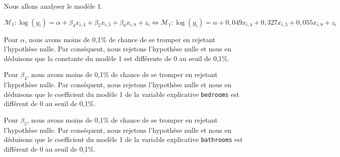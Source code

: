 \documentclass[
  11pt,
  french,
]{article}
\begin{document}
\begin{table}[!h]

\caption{\label{tab:unnamed-chunk-25}Comparaison des performances des régressions linéaires de l'analyse 2}
\centering
{}
\end{table}

Nous allons analyser le modèle 1.

\[\mathcal{M}_{1}:\log(y_{i})=\alpha+\beta_{4}x_{i,4}+\beta_{5}x_{i,5}+\beta_{8}x_{i,8}+z_{i} \iff \mathcal{M}_{1}:\log(y_{i})=\alpha+0,049x_{i,4}+0,327x_{i,5}+0,055x_{i,8}+z_{i}\]

Pour \(\alpha\), nous avons moins de 0,1\% de chance de se tromper en
rejetant l'hypothèse nulle. Par conséquent, nous rejetons l'hypothèse
nulle et nous en déduisons que la constante du modèle 1 est différente
de 0 au seuil de 0,1\%.

Pour \(\beta_{4}\), nous avons moins de 0,1\% de chance de se tromper en
rejetant l'hypothèse nulle. Par conséquent, nous rejetons l'hypothèse
nulle et nous en déduisons que le coefficient du modèle 1 de la variable
explicative \texttt{bedrooms} est différent de 0 au seuil de 0,1\%.

Pour \(\beta_{5}\), nous avons moins de 0,1\% de chance de se tromper en
rejetant l'hypothèse nulle. Par conséquent, nous rejetons l'hypothèse
nulle et nous en déduisons que le coefficient du modèle 1 de la variable
explicative \texttt{bathrooms} est différent de 0 au seuil de 0,1\%.
\end{document}
